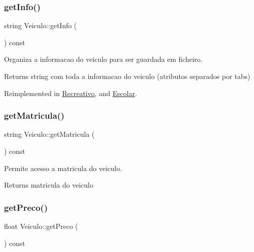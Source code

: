 \subsubsection{\texorpdfstring{get\+Info()}{getInfo()}}
{\footnotesize\ttfamily string Veiculo\+::get\+Info (\begin{DoxyParamCaption}{ }\end{DoxyParamCaption}) const\hspace{0.3cm}{\ttfamily [virtual]}}



Organiza a informacao do veiculo para ser guardada em ficheiro. 

\begin{DoxyReturn}{Returns}
string com toda a informacao do veiculo (atributos separados por tabs) 
\end{DoxyReturn}


Reimplemented in \mbox{\hyperlink{class_recreativo_a594c854bbcb834cff82c0687afa2b9ce}{Recreativo}}, and \mbox{\hyperlink{class_escolar_aa1f8528c1457656ba5772a253c51b872}{Escolar}}.

\mbox{\label{class_veiculo_ac41e88b8567d6fca2e932d2df3fd23b5}} 
\subsubsection{\texorpdfstring{get\+Matricula()}{getMatricula()}}
{\footnotesize\ttfamily string Veiculo\+::get\+Matricula (\begin{DoxyParamCaption}{ }\end{DoxyParamCaption}) const}



Permite acesso a matricula do veiculo. 

\begin{DoxyReturn}{Returns}
matricula do veiculo 
\end{DoxyReturn}
\mbox{\label{class_veiculo_a9f553ab3febd3b756643533f065a289a}} 
\subsubsection{\texorpdfstring{get\+Preco()}{getPreco()}}
{\footnotesize\ttfamily float Veiculo\+::get\+Preco (\begin{DoxyParamCaption}{ }\end{DoxyParamCaption}) const}



